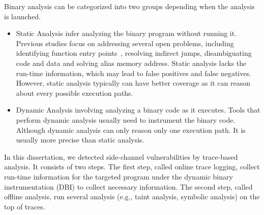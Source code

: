 Binary analysis can be categorized into two groups depending when the analysis is
launched.
\begin{itemize}
    \item Static Analysis infer analyzing the binary program without running it. Previous studies focus on addressing several open problems, including identifying
    function entry points~\cite{184521, Wang17a}, resolving indirect jumps, disambiguating code and data and solving alias memory address. Static analysis
    lacks the run-time information, which may lead to false positives and false 
    negatives. However, static analysis typically can have better coverage as it can
    reason about every possible execution paths.
    \item Dynamic Analysis involving analyzing a binary code as it executes. Tools
    that perform dynamic analysis usually need to instrument the binary code.  
    Although dynamic analysis can only reason only one execution path. It is usually more precise than static analysis.
\end{itemize}

In this dissertation, we detected side-channel vulnerabilities by trace-based analysis.
It consists of two steps. The first step, called online trace logging, collect run-time
information for the targeted program under the dynamic binary instrumentation (DBI)
to collect necessary information. The second step, called offline analysis, run
several analysis (e.g., taint analysis, symbolic analysis) on the top of traces.  

